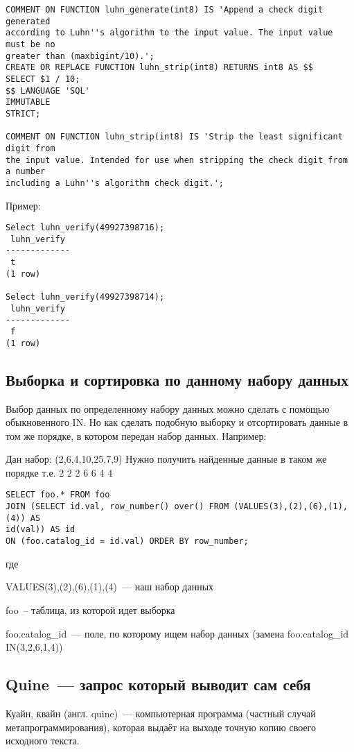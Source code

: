 \begin{lstlisting}[label=lst:snippets10,title=snippets/luhn\_algorithm.sql]
COMMENT ON FUNCTION luhn_generate(int8) IS 'Append a check digit generated
according to Luhn''s algorithm to the input value. The input value must be no
greater than (maxbigint/10).';
CREATE OR REPLACE FUNCTION luhn_strip(int8) RETURNS int8 AS $$
SELECT $1 / 10;
$$ LANGUAGE 'SQL'
IMMUTABLE
STRICT;
 
COMMENT ON FUNCTION luhn_strip(int8) IS 'Strip the least significant digit from
the input value. Intended for use when stripping the check digit from a number
including a Luhn''s algorithm check digit.';
\end{lstlisting}

Пример:
\begin{lstlisting}[label=lst:snippets11,caption=Алгоритм Луна. Пример]
Select luhn_verify(49927398716);
 luhn_verify 
-------------
 t
(1 row)

Select luhn_verify(49927398714);
 luhn_verify 
-------------
 f
(1 row)

\end{lstlisting}

\subsection{Выборка и сортировка по данному набору данных}
Выбор данных по определенному набору данных можно сделать с помощью обыкновенного IN. Но как сделать подобную выборку и отсортировать 
данные в том же порядке, в котором передан набор данных. Например:

Дан набор: (2,6,4,10,25,7,9)
Нужно получить найденные данные в таком же порядке т.е. 2 2 2 6 6 4 4

\begin{lstlisting}[label=lst:snippets12,title=snippets/order\_like\_in.sql]
SELECT foo.* FROM foo                                           
JOIN (SELECT id.val, row_number() over() FROM (VALUES(3),(2),(6),(1),(4)) AS
id(val)) AS id
ON (foo.catalog_id = id.val) ORDER BY row_number;
\end{lstlisting}

где

VALUES(3),(2),(6),(1),(4)~--- наш набор данных

foo~-- таблица, из которой идет выборка

foo.catalog\_id~--- поле, по которому ищем набор данных (замена foo.catalog\_id IN(3,2,6,1,4))

\subsection{Quine~--- запрос который выводит сам себя}
Куайн, квайн (англ. quine)~--- компьютерная программа (частный случай метапрограммирования), 
которая выдаёт на выходе точную копию своего исходного текста. 

